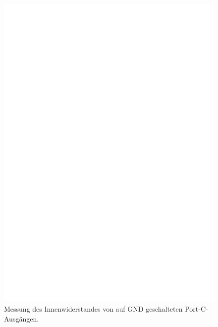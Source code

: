 \begin{enumerate}
\begin{figure}[H]
\includegraphics[]{../FIG/Test7.eps}
\caption{Messung des Innenwiderstandes von auf GND geschalteten Port-C-Ausgängen.}
\label{fig:test7}
\end{figure}


\end{enumerate}
